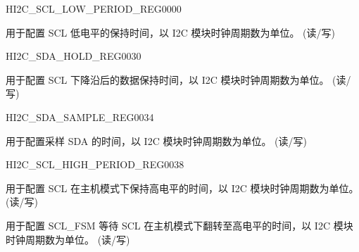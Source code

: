 \begin{register}{H}{I2C\_SCL\_LOW\_PERIOD\_REG}{\hexprefix{}0000}\label{regdesc:I2CSCLLOWPERIODREG}
%
%
\regnewline%
\begin{regdesc}\begin{reglist}
\label{fielddesc:I2CSCLLOWPERIOD}\item [I2C\_SCL\_LOW\_PERIOD] 用于配置 SCL 低电平的保持时间，以 I2C 模块时钟周期数为单位。 (读/写)
\end{reglist}\end{regdesc}
\end{register}


\begin{register}{H}{I2C\_SDA\_HOLD\_REG}{\hexprefix{}0030}\label{regdesc:I2CSDAHOLDREG}
%
%
\regnewline%
\begin{regdesc}\begin{reglist}
\label{fielddesc:I2CSDAHOLDTIME}\item [I2C\_SDA\_HOLD\_TIME] 用于配置 SCL 下降沿后的数据保持时间，以 I2C 模块时钟周期数为单位。 (读/写)
\end{reglist}\end{regdesc}
\end{register}


\begin{register}{H}{I2C\_SDA\_SAMPLE\_REG}{\hexprefix{}0034}\label{regdesc:I2CSDASAMPLEREG}
%
%
\regnewline%
\begin{regdesc}\begin{reglist}
\label{fielddesc:I2CSDASAMPLETIME}\item [I2C\_SDA\_SAMPLE\_TIME] 用于配置采样 SDA 的时间，以 I2C 模块时钟周期数为单位。 (读/写)
\end{reglist}\end{regdesc}
\end{register}


\begin{register}{H}{I2C\_SCL\_HIGH\_PERIOD\_REG}{\hexprefix{}0038}\label{regdesc:I2CSCLHIGHPERIODREG}
%
%
%
\regnewline%
\begin{regdesc}\begin{reglist}
\label{fielddesc:I2CSCLHIGHPERIOD}\item [I2C\_SCL\_HIGH\_PERIOD] 用于配置 SCL 在主机模式下保持高电平的时间，以 I2C 模块时钟周期数为单位。 (读/写)
\label{fielddesc:I2CSCLWAITHIGHPERIOD}\item [I2C\_SCL\_WAIT\_HIGH\_PERIOD] 用于配置 SCL\_FSM 等待 SCL 在主机模式下翻转至高电平的时间，以 I2C 模块时钟周期数为单位。 (读/写)
\end{reglist}\end{regdesc}
\end{register}


